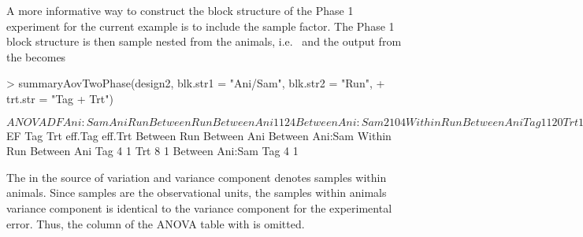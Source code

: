 \documentclass[article]{jss}
\begin{document}
A more informative way to construct the block structure of the Phase 1 experiment for the current example is to include the sample factor. The Phase 1 block structure is then sample nested from the animals, i.e.\  and the output from the  becomes
\begin{CodeChunk}
\begin{CodeInput}
> summaryAovTwoPhase(design2, blk.str1 = "Ani/Sam", blk.str2 = "Run", 
+  trt.str = "Tag + Trt")                                    
\end{CodeInput}
\begin{CodeOutput}
$ANOVA
                   DF Ani:Sam Ani Run
Between Run                          
   Between Ani     1  1       2   4  
   Between Ani:Sam 2  1       0   4  
Within Run                           
   Between Ani                       
      Tag          1  1       2   0  
      Trt          1  1       2   0  
      Residual     4  1       2   0  
   Between Ani:Sam                   
      Tag          2  1       0   0  
      Residual     4  1       0   0  
$EF
                   Tag Trt eff.Tag eff.Trt
Between Run                               
   Between Ani                            
   Between Ani:Sam                        
Within Run                                
   Between Ani                            
      Tag          4       1              
      Trt              8           1      
   Between Ani:Sam                        
      Tag          4       1               
\end{CodeOutput}
\end{CodeChunk}
The  in the source of variation and variance component denotes samples within animals. Since samples are the observational units, the samples within animals variance component is identical to the variance component for the experimental error. Thus, the column of the ANOVA table with  is omitted.
\end{document}
